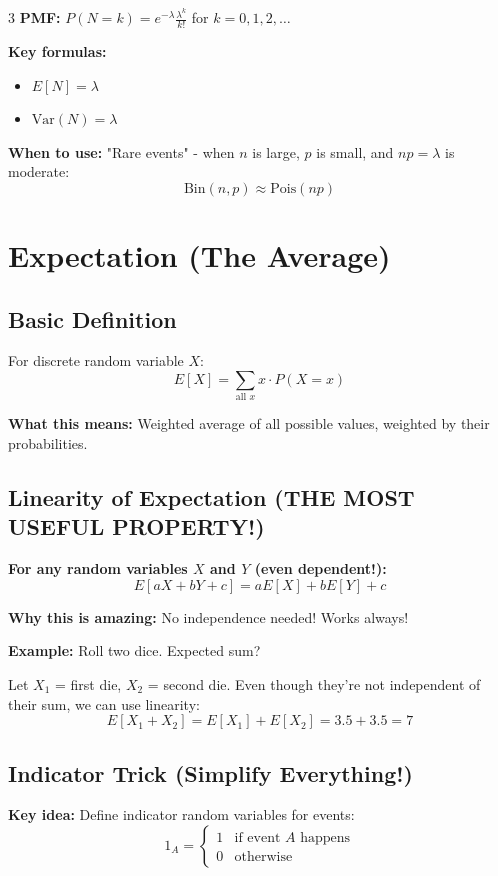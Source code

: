 \documentclass[10pt,landscape]{article}
\begin{document}
\begin{multicols}{3}
\textbf{PMF:} $P(N = k) = e^{-\lambda} \frac{\lambda^k}{k!}$ for $k = 0, 1, 2, \ldots$

\textbf{Key formulas:}
\begin{itemize}[leftmargin=*,noitemsep,topsep=0pt]
\item $E[N] = \lambda$
\item $\text{Var}(N) = \lambda$
\end{itemize}

\textbf{When to use:} "Rare events" - when $n$ is large, $p$ is small, and $np = \lambda$ is moderate:
$$\text{Bin}(n, p) \approx \text{Pois}(np)$$

\section{Expectation (The Average)}

\subsection{Basic Definition}
For discrete random variable $X$:
$$E[X] = \sum_{\text{all } x} x \cdot P(X = x)$$

\textbf{What this means:} Weighted average of all possible values, weighted by their probabilities.

\subsection{Linearity of Expectation (THE MOST USEFUL PROPERTY!)}
\textbf{For any random variables $X$ and $Y$ (even dependent!):}
$$E[aX + bY + c] = aE[X] + bE[Y] + c$$

\textbf{Why this is amazing:} No independence needed! Works always!

\textbf{Example:} Roll two dice. Expected sum?

Let $X_1$ = first die, $X_2$ = second die. Even though they're not independent of their sum, we can use linearity:
$$E[X_1 + X_2] = E[X_1] + E[X_2] = 3.5 + 3.5 = 7$$

\subsection{Indicator Trick (Simplify Everything!)}
\textbf{Key idea:} Define indicator random variables for events:
$$1_A = \begin{cases} 1 & \text{if event } A \text{ happens} \\ 0 & \text{otherwise} \end{cases}$$


\end{multicols}
\end{document}
